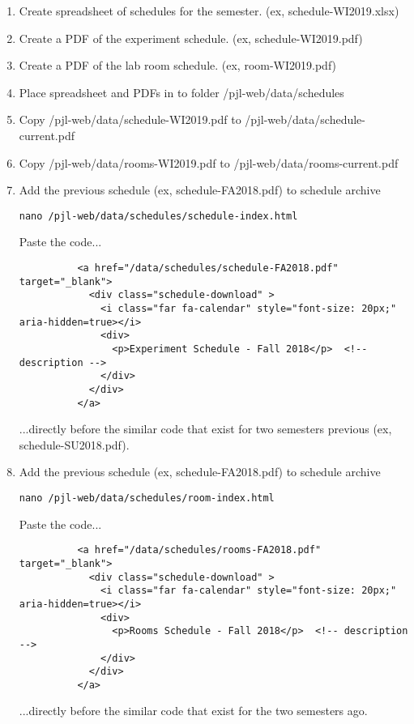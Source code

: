 \documentclass[justified]{LabArx3_5_1}
\begin{document}
\begin{enumerate}

\item Create spreadsheet of schedules for the semester. (ex, schedule-WI2019.xlsx)

\item Create a PDF of the experiment schedule. (ex, schedule-WI2019.pdf)

\item Create a PDF of the lab room schedule. (ex, room-WI2019.pdf)

\item Place spreadsheet and PDFs in to folder /pjl-web/data/schedules

\item Copy /pjl-web/data/schedule-WI2019.pdf to /pjl-web/data/schedule-current.pdf

\item Copy /pjl-web/data/rooms-WI2019.pdf to /pjl-web/data/rooms-current.pdf

\item Add the previous schedule (ex, schedule-FA2018.pdf) to schedule archive

\begin{lstlisting}
nano /pjl-web/data/schedules/schedule-index.html       
\end{lstlisting}

Paste the code...
\begin{lstlisting}
          <a href="/data/schedules/schedule-FA2018.pdf" target="_blank">
            <div class="schedule-download" >
              <i class="far fa-calendar" style="font-size: 20px;" aria-hidden=true></i> 
              <div>
                <p>Experiment Schedule - Fall 2018</p>  <!-- description -->
              </div>
            </div>
          </a>
\end{lstlisting}

...directly before the similar code that exist for two semesters previous (ex, schedule-SU2018.pdf).

\item Add the previous schedule (ex, schedule-FA2018.pdf) to schedule archive

\begin{lstlisting}
nano /pjl-web/data/schedules/room-index.html       
\end{lstlisting}

Paste the code...
\begin{lstlisting}
          <a href="/data/schedules/rooms-FA2018.pdf" target="_blank">
            <div class="schedule-download" >
              <i class="far fa-calendar" style="font-size: 20px;" aria-hidden=true></i> 
              <div>
                <p>Rooms Schedule - Fall 2018</p>  <!-- description -->
              </div>
            </div>
          </a>
\end{lstlisting}

...directly before the similar code that exist for the two semesters ago.

\end{enumerate}
\end{document}
